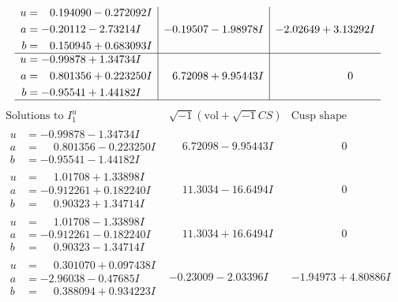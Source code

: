 \documentclass[1p]{elsarticle_modified}
\theoremstyle{definition}
\newcommand{\I}{\sqrt{-1}}
\begin{document}
$$\begin{array}{c|c|c}
\begin{aligned}
u &= \phantom{-}0.194090 - 0.272092 I \\
a &= -0.20112 - 2.73214 I \\
b &= \phantom{-}0.150945 + 0.683093 I\end{aligned}
 & -0.19507 - 1.98978 I & -2.02649 + 3.13292 I \\ \hline\begin{aligned}
u &= -0.99878 + 1.34734 I \\
a &= \phantom{-}0.801356 + 0.223250 I \\
b &= -0.95541 + 1.44182 I\end{aligned}
 & \phantom{-}6.72098 + 9.95443 I & \phantom{-0.000000 } 0\\
 \hline 
 \end{array}$$\newpage$$\begin{array}{c|c|c}  
\text{Solutions to }I^u_{1}& \I (\text{vol} + \sqrt{-1}CS) & \text{Cusp shape}\\
 \hline 
\begin{aligned}
u &= -0.99878 - 1.34734 I \\
a &= \phantom{-}0.801356 - 0.223250 I \\
b &= -0.95541 - 1.44182 I\end{aligned}
 & \phantom{-}6.72098 - 9.95443 I & \phantom{-0.000000 } 0 \\ \hline\begin{aligned}
u &= \phantom{-}1.01708 + 1.33898 I \\
a &= -0.912261 + 0.182240 I \\
b &= \phantom{-}0.90323 + 1.34714 I\end{aligned}
 & \phantom{-}11.3034 - 16.6494 I & \phantom{-0.000000 } 0 \\ \hline\begin{aligned}
u &= \phantom{-}1.01708 - 1.33898 I \\
a &= -0.912261 - 0.182240 I \\
b &= \phantom{-}0.90323 - 1.34714 I\end{aligned}
 & \phantom{-}11.3034 + 16.6494 I & \phantom{-0.000000 } 0 \\ \hline\begin{aligned}
u &= \phantom{-}0.301070 + 0.097438 I \\
a &= -2.96038 - 0.47685 I \\
b &= \phantom{-}0.388094 + 0.934223 I\end{aligned}
 & -0.23009 - 2.03396 I & -1.94973 + 4.80886 I \\ \hline\begin{aligned}

\end{aligned}
\end{array}$$
\end{document}
